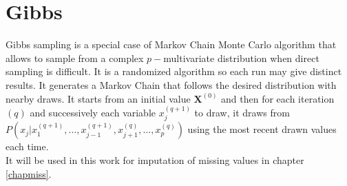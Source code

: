 \documentclass[12pt,a4paper]{report}
\begin{document}
		\FloatBarrier
		
		\section{Gibbs}
		Gibbs sampling \cite{casella1992explaining} is a special case of Markov Chain Monte Carlo algorithm \cite{gilks1996markov,chib1995understanding,roberts2001optimal} that allows to sample from a complex $p-$multivariate distribution when direct sampling is difficult. It is a randomized algorithm so each run may give distinct results. It generates a Markov Chain that follows the desired distribution with nearby draws. It starts from an initial value $\boldsymbol{X}^{(0)}$ and then for each iteration $(q)$ and successively each variable $x_j^{(q+1)}$ to draw, it draws from $P(x_j|x_1^{(q+1)}, \dots,x_{j-1}^{(q+1)},x_{j+1}^{(q)},\dots,x_p^{(q)})$ using the most recent drawn values each time. \\
		It will be used in this work for imputation of missing values in chapter \ref{chapmiss}.
		
\end{document}
